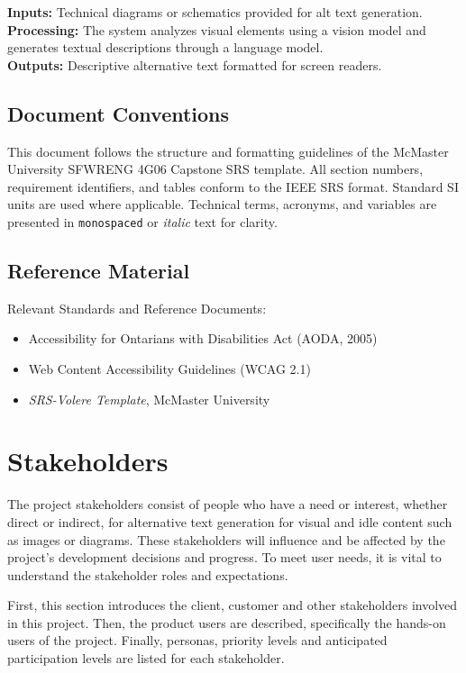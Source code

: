 \documentclass[12pt]{article}
\begin{document}
\textbf{Inputs:} Technical diagrams or schematics provided for alt text generation. \\[2mm]
\textbf{Processing:} The system analyzes visual elements using a
vision model and generates textual descriptions through a language
model. \\[2mm]
\textbf{Outputs:} Descriptive alternative text formatted for screen
readers.

\subsection{Document Conventions}

This document follows the structure and formatting guidelines of the
McMaster University SFWRENG 4G06 Capstone SRS template.
All section numbers, requirement identifiers, and tables conform to
the IEEE SRS format.
Standard SI units are used where applicable.
Technical terms, acronyms, and variables are presented in
\texttt{monospaced} or \textit{italic} text for clarity.

\subsection{Reference Material}
Relevant Standards and Reference Documents:
\begin{itemize}
  \item Accessibility for Ontarians with Disabilities Act (AODA, 2005)
  \item Web Content Accessibility Guidelines (WCAG 2.1)
  \item \textit{SRS-Volere Template}, McMaster University
\end{itemize}

\section{Stakeholders}
The project stakeholders consist of people who have a need or
interest, whether direct or indirect, for alternative text generation
for visual and idle
content such as images or diagrams. These stakeholders will
influence and be affected by the
project's development decisions and progress. To meet user
needs, it is vital to understand the stakeholder roles and expectations.
\par First, this section introduces the client, customer and other
stakeholders involved in this project. Then, the product users are
described, specifically the hands-on users of the project. Finally,
personas, priority levels and anticipated
participation levels are listed for each stakeholder.
\end{document}
